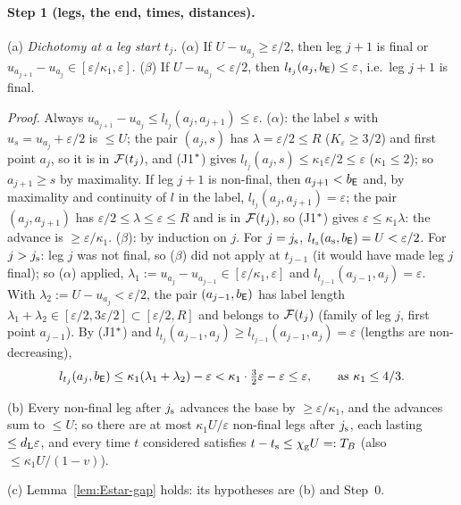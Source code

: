 \paragraph{Step 1 (legs, the end, times, distances).}
(a) \emph{Dichotomy at a leg start $t_j$.} ($\alpha$) If $U-u_{a_j}\ge\varepsilon/2$, then leg $j+1$ is final or
$u_{a_{j+1}}-u_{a_j}\in[\varepsilon/\kappa_1,\varepsilon]$. ($\beta$) If $U-u_{a_j}<\varepsilon/2$, then
$l_{t_j}(a_j,b_{\mathsf E})\le\varepsilon$, i.e.\ leg $j+1$ is final.

\emph{Proof.} Always $u_{a_{j+1}}-u_{a_j}\le l_{t_j}(a_j,a_{j+1})\le\varepsilon$. ($\alpha$): the label $s$ with
$u_s=u_{a_j}+\varepsilon/2$ is $\le U$; the pair $(a_j,s)$ has $\lambda=\varepsilon/2\le R$ ($K_\varepsilon\ge3/2$) and first point
$a_j$, so it is in $\mathcal F(t_j)$, and (J1$^{*}$) gives $l_{t_j}(a_j,s)\le\kappa_1\varepsilon/2\le\varepsilon$ ($\kappa_1\le2$); so
$a_{j+1}\ge s$ by maximality. If leg $j+1$ is non-final, then $a_{j+1}<b_{\mathsf E}$ and, by maximality and continuity of $l$ in the label,
$l_{t_j}(a_j,a_{j+1})=\varepsilon$; the pair $(a_j,a_{j+1})$ has $\varepsilon/2\le\lambda\le\varepsilon\le R$ and is in $\mathcal F(t_j)$,
so (J1$^{*}$) gives $\varepsilon\le\kappa_1\lambda$: the advance is $\ge\varepsilon/\kappa_1$.
($\beta$): by induction on $j$. For $j=j_{\mathrm s}$, $l_{t_{\mathrm s}}(a_{\mathrm s},b_{\mathsf E})=U<\varepsilon/2$. For $j>j_{\mathrm s}$: leg $j$ was not final, so
($\beta$) did not apply at $t_{j-1}$ (it would have made leg $j$ final); so ($\alpha$) applied,
$\lambda_1:=u_{a_j}-u_{a_{j-1}}\in[\varepsilon/\kappa_1,\varepsilon]$ and $l_{t_{j-1}}(a_{j-1},a_j)=\varepsilon$. With
$\lambda_2:=U-u_{a_j}<\varepsilon/2$, the pair $(a_{j-1},b_{\mathsf E})$ has label length
$\lambda_1+\lambda_2\in[\varepsilon/2,3\varepsilon/2]\subset[\varepsilon/2,R]$ and belongs to $\mathcal F(t_j)$ (family of leg $j$, first point
$a_{j-1}$). By (J1$^{*}$) and $l_{t_j}(a_{j-1},a_j)\ge l_{t_{j-1}}(a_{j-1},a_j)=\varepsilon$ (lengths are non-decreasing),
\[
l_{t_j}(a_j,b_{\mathsf E})\le\kappa_1(\lambda_1+\lambda_2)-\varepsilon<\kappa_1\cdot\tfrac32\varepsilon-\varepsilon\le\varepsilon,
\qquad\text{as }\kappa_1\le4/3 .
\]

(b) Every non-final leg after $j_{\mathrm s}$ advances the base by $\ge\varepsilon/\kappa_1$, and the advances sum to $\le U$; so there are at
most $\kappa_1U/\varepsilon$ non-final legs after $j_{\mathrm s}$, each lasting $\le d_{\mathrm L}\varepsilon$, and every time $t$ considered satisfies
$t-t_{\mathrm s}\le\chi_{\mathrm g} U=:T_B$ (also $\le\kappa_1U/(1-v)$).

(c) Lemma~\ref{lem:Estar-gap} holds: its hypotheses are (b) and Step~0.

